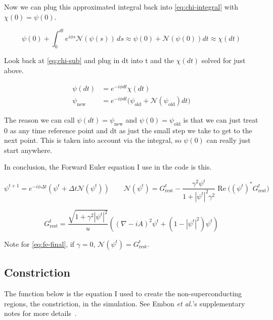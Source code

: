 \documentclass[11pt]{article}
\theoremstyle{definition}
\renewcommand{\Re}{\operatorname{Re}}
\begin{document}
Now we can plug this approximated integral back into \cref{eq:chi-integral} with $\chi(0) = \psi(0)$.

\begin{equation}
\label{eq:chi-dt-approx}
\psi(0) + \int_0^{dt} e^{i \phi s} \mathcal{N}(\psi(s)) \, ds \approx \psi(0) + \mathcal{N}(\psi(0)) dt \approx \chi(dt)
\end{equation}

Look back at \cref{eq:chi-sub} and plug in dt into t and the $\chi(dt)$ solved for just above.

\begin{align}
\psi(dt) &= e^{-i \phi dt} \chi(dt) \label{eq:psi-dt}\\
\psi_{\mathrm{new}} &= e^{-i \phi dt} \big( \psi_{\mathrm{old}} + \mathcal{N}(\psi_{\mathrm{old}}) dt \big) \label{eq:psi-new}
\end{align}

The reason we can call $\psi(dt) = \psi_{\mathrm{new}}$ and $\psi(0) = \psi_{\mathrm{old}}$ is that we can just treat 0 as any time reference point and dt as just the small step we take to get to the next point. This is taken into account via the integral, so $\psi(0)$ can really just start anywhere.

In conclusion, the Forward Euler equation I use in the code is this.

\begin{equation}
\label{eq:fe-final}
\psi^{t+1} = e^{-i \phi \Delta t} (\psi^t + \Delta t \mathcal{N}(\psi^t)) \qquad \mathcal{N}(\psi^t) = G_{\mathrm{rest}}^t - \frac{\gamma^2 \psi^t}{1 + |\psi^t|^2 \gamma^2} \Re\big( (\psi^t)^* G_{\mathrm{rest}}^t \big)
\end{equation}

\begin{equation}
\label{eq:Grest-final}
G_{\mathrm{rest}}^t = \frac{\sqrt{1 + \gamma^2 |\psi^t|^2}}{u} \left( (\nabla - iA)^2 \psi^t + (1 - |\psi^t|^2) \psi^t \right)
\end{equation}

Note for \cref{eq:fe-final}, if $\gamma = 0$, $\mathcal{N}(\psi^t) = G_{\mathrm{rest}}^t.$

\subsection{Constriction}
\label{sec:constriction}

The function below is the equation I used to create the non-superconducting regions, the constriction, in the simulation. See Embon \textit{et al.}'s supplementary notes for more details~\cite{embon-supps}.
\end{document}
